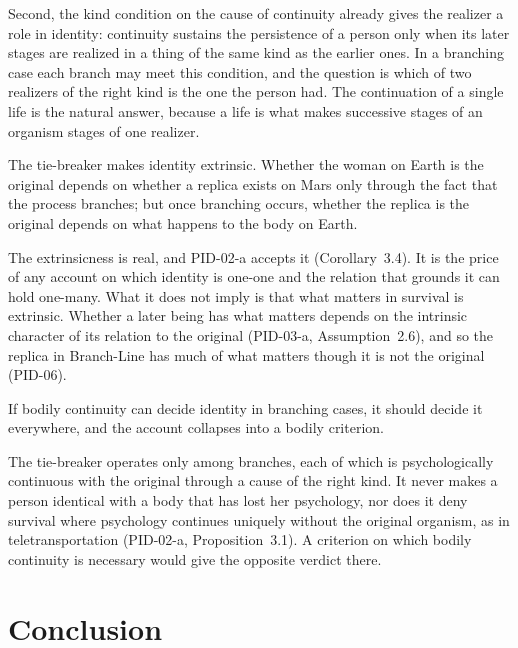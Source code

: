 \documentclass{situationist-preprint}
\begin{document}
Second, the kind condition on the cause of continuity already gives the realizer a role in identity: continuity sustains the persistence of a person only when its later stages are realized in a thing of the same kind as the earlier ones. In a branching case each branch may meet this condition, and the question is which of two realizers of the right kind is the one the person had. The continuation of a single life is the natural answer, because a life is what makes successive stages of an organism stages of one realizer.

\begin{objection}
The tie-breaker makes identity extrinsic. Whether the woman on Earth is the original depends on whether a replica exists on Mars only through the fact that the process branches; but once branching occurs, whether the replica is the original depends on what happens to the body on Earth.
\end{objection}

\begin{reply}
The extrinsicness is real, and PID-02-a accepts it (Corollary~3.4). It is the price of any account on which identity is one-one and the relation that grounds it can hold one-many. What it does not imply is that what matters in survival is extrinsic. Whether a later being has what matters depends on the intrinsic character of its relation to the original (PID-03-a, Assumption~2.6), and so the replica in Branch-Line has much of what matters though it is not the original (PID-06).
\end{reply}

\begin{objection}
If bodily continuity can decide identity in branching cases, it should decide it everywhere, and the account collapses into a bodily criterion.
\end{objection}

\begin{reply}
The tie-breaker operates only among branches, each of which is psychologically continuous with the original through a cause of the right kind. It never makes a person identical with a body that has lost her psychology, nor does it deny survival where psychology continues uniquely without the original organism, as in teletransportation (PID-02-a, Proposition~3.1). A criterion on which bodily continuity is necessary would give the opposite verdict there.
\end{reply}

\section{Conclusion}
\end{document}

